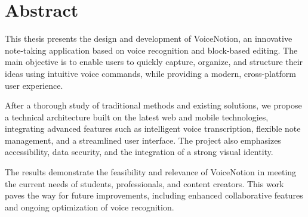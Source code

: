 \chapter*{Abstract}
This thesis presents the design and development of VoiceNotion, an innovative note-taking application based on voice recognition and block-based editing. The main objective is to enable users to quickly capture, organize, and structure their ideas using intuitive voice commands, while providing a modern, cross-platform user experience.

After a thorough study of traditional methods and existing solutions, we propose a technical architecture built on the latest web and mobile technologies, integrating advanced features such as intelligent voice transcription, flexible note management, and a streamlined user interface. The project also emphasizes accessibility, data security, and the integration of a strong visual identity.

The results demonstrate the feasibility and relevance of VoiceNotion in meeting the current needs of students, professionals, and content creators. This work paves the way for future improvements, including enhanced collaborative features and ongoing optimization of voice recognition.
